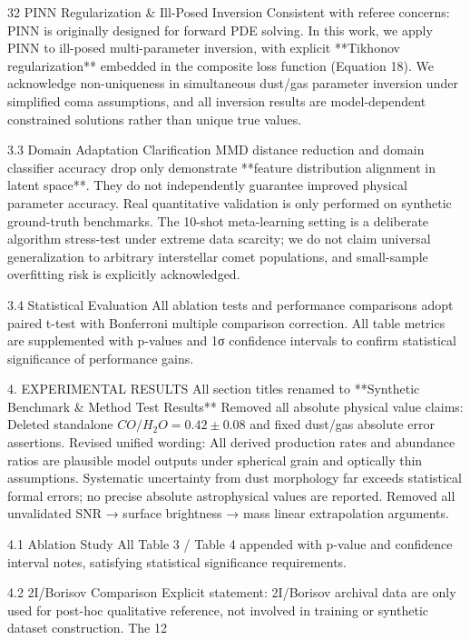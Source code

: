 32 PINN Regularization & Ill-Posed Inversion
Consistent with referee concerns: PINN is originally designed for forward PDE solving. In this work, we apply PINN to ill-posed multi-parameter inversion, with explicit **Tikhonov regularization** embedded in the composite loss function (Equation 18). We acknowledge non-uniqueness in simultaneous dust/gas parameter inversion under simplified coma assumptions, and all inversion results are model-dependent constrained solutions rather than unique true values.

3.3 Domain Adaptation Clarification
MMD distance reduction and domain classifier accuracy drop only demonstrate **feature distribution alignment in latent space**. They do not independently guarantee improved physical parameter accuracy. Real quantitative validation is only performed on synthetic ground-truth benchmarks.
The 10-shot meta-learning setting is a deliberate algorithm stress-test under extreme data scarcity; we do not claim universal generalization to arbitrary interstellar comet populations, and small-sample overfitting risk is explicitly acknowledged.

3.4 Statistical Evaluation
All ablation tests and performance comparisons adopt paired t-test with Bonferroni multiple comparison correction. All table metrics are supplemented with p-values and 1σ confidence intervals to confirm statistical significance of performance gains.

4. EXPERIMENTAL RESULTS
All section titles renamed to **Synthetic Benchmark & Method Test Results**
Removed all absolute physical value claims:
Deleted standalone \(CO/H_2O=0.42\pm0.08\) and fixed dust/gas absolute error assertions.
Revised unified wording:
All derived production rates and abundance ratios are plausible model outputs under spherical grain and optically thin assumptions. Systematic uncertainty from dust morphology far exceeds statistical formal errors; no precise absolute astrophysical values are reported.
Removed all unvalidated SNR → surface brightness → mass linear extrapolation arguments.

4.1 Ablation Study
All Table 3 / Table 4 appended with p-value and confidence interval notes, satisfying statistical significance requirements.

4.2 2I/Borisov Comparison
Explicit statement:
2I/Borisov archival data are only used for post-hoc qualitative reference, not involved in training or synthetic dataset construction. The 12%


